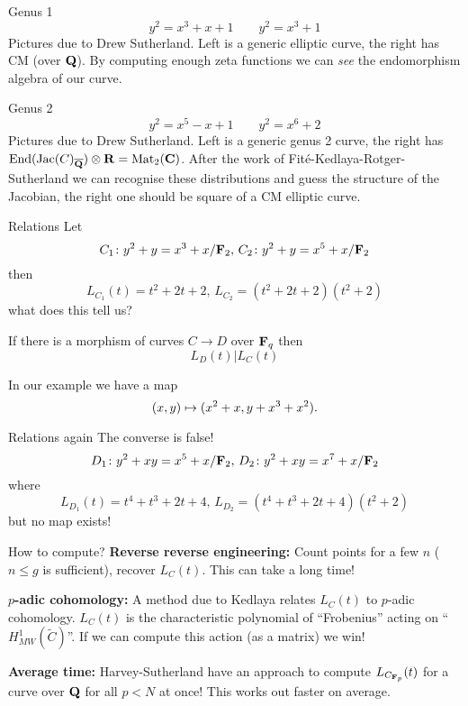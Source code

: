 \begin{frame}{Genus 1}
    \[y^2 = x^3 + x+ 1 \qquad y^2 =x^3 + 1\]
    Pictures due to Drew Sutherland.
    \pause
    Left is a generic elliptic curve, the right has CM (over $\mathbf Q$).
    \pause
    By computing enough zeta functions we can \emph{see} the endomorphism algebra of our curve.
\end{frame}

\begin{frame}{Genus 2}
    \[y^2 = x^5 - x + 1 \qquad y^2 =x^6 + 2\]
    Pictures due to Drew Sutherland.
    \pause
    Left is a generic genus 2 curve, the right has $\operatorname{End}(\operatorname{Jac}(C)_{\overline{\mathbf Q}})\otimes \mathbf R = \operatorname{Mat}_2(\mathbf C)$.
    \pause
    After the work of Fit\'e-Kedlaya-Rotger-Sutherland we can recognise these distributions and guess the structure of the Jacobian, the right one should be square of a CM elliptic curve.
\end{frame}

\begin{frame}{Relations}
    Let
    \[ C_1 \colon y^2 + y = x^3 + x/\mathbf F_2,\, C_2 \colon y^2 + y = x^5 + x/\mathbf F_2\]\pause
    then
    \[ L_{C_1}(t) = t^2 + 2t + 2 ,\,L_{C_2} = ( t^2 + 2t + 2)(t^2 + 2)\]
    what does this tell us?\pause

    \begin{theorem}
        If there is a morphism of curves \(C\to D\) over \(\mathbf F_q\) then
        \[L_D(t) | L_C(t)\]
    \end{theorem} \pause

    In our example we have a map
    \[(x,y) \mapsto (x^2 + x, y + x^3 + x^2)\text.\]

\end{frame}

\begin{frame}{Relations again}
    The converse is false!
    \[ D_1 \colon y^2 + xy = x^5 + x/\mathbf F_2,\, D_2 \colon y^2 + xy = x^7 + x/\mathbf F_2\]\pause
    where
    \[ L_{D_1}(t) = t^4 + t^3 + 2t + 4 ,\,L_{D_2} = ( t^4 + t^3 + 2t + 4 )(t^2 + 2)\]
    but no map exists!
\end{frame}


\begin{frame}{How to compute?}
    \textbf{Reverse reverse engineering:}
    Count points for a few $n$ ($n\le g$ is sufficient), recover $L_C(t)$.  \pause
    This can take a long time! \pause

    \textbf{$p$-adic cohomology:}
    A method due to Kedlaya relates $L_C(t)$ to $p$-adic cohomology.
    $L_C(t)$ is the characteristic polynomial of ``Frobenius'' acting on ``$H^1_{MW}(\tilde C)$''.
    If we can compute this action (as a matrix) we win!
    \pause

    \textbf{Average time:}
    Harvey-Sutherland have an approach to compute $L_{C_{\mathbf F_p}}(t)$ for a curve over $\mathbf Q$ for all $p \lt N$ at once!
    This works out faster on average.
\end{frame}

